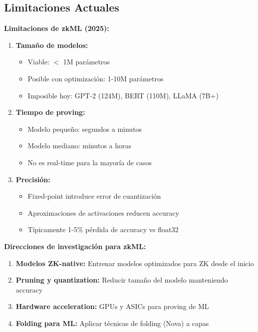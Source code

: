 \documentclass[11pt,a4paper,twoside]{book}
\begin{document}
\subsection{Limitaciones Actuales}

\begin{remark}
\textbf{Limitaciones de zkML (2025):}

\begin{enumerate}
    \item \textbf{Tama\~no de modelos:}
    \begin{itemize}
        \item Viable: $<$ 1M par\'ametros
        \item Posible con optimizaci\'on: 1-10M par\'ametros
        \item Imposible hoy: GPT-2 (124M), BERT (110M), LLaMA (7B+)
    \end{itemize}
    
    \item \textbf{Tiempo de proving:}
    \begin{itemize}
        \item Modelo peque\~no: segundos a minutos
        \item Modelo mediano: minutos a horas
        \item No es real-time para la mayor\'ia de casos
    \end{itemize}
    
    \item \textbf{Precisi\'on:}
    \begin{itemize}
        \item Fixed-point introduce error de cuantizaci\'on
        \item Aproximaciones de activaciones reducen accuracy
        \item T\'ipicamente 1-5\% p\'erdida de accuracy vs float32
    \end{itemize}
\end{enumerate}
\end{remark}

\begin{keyidea}
\textbf{Direcciones de investigaci\'on para zkML:}
\begin{enumerate}
    \item \textbf{Modelos ZK-native:} Entrenar modelos optimizados para ZK desde el inicio
    \item \textbf{Pruning y quantization:} Reducir tama\~no del modelo manteniendo accuracy
    \item \textbf{Hardware acceleration:} GPUs y ASICs para proving de ML
    \item \textbf{Folding para ML:} Aplicar t\'ecnicas de folding (Nova) a capas
\end{enumerate}
\end{keyidea}
\end{document}
